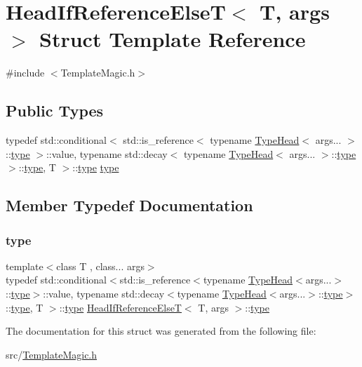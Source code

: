 \hypertarget{struct_head_if_reference_else_t}{}\section{Head\+If\+Reference\+ElseT$<$ T, args $>$ Struct Template Reference}
\label{struct_head_if_reference_else_t}


{\ttfamily \#include $<$Template\+Magic.\+h$>$}

\subsection*{Public Types}
\begin{DoxyCompactItemize}
\item 
typedef std\+::conditional$<$ std\+::is\+\_\+reference$<$ typename \hyperlink{struct_type_head}{Type\+Head}$<$ args... $>$\+::\hyperlink{struct_head_if_reference_else_t_aa668af542560a9a8541b1ff59f23d51a}{type} $>$\+::value, typename std\+::decay$<$ typename \hyperlink{struct_type_head}{Type\+Head}$<$ args... $>$\+::\hyperlink{struct_head_if_reference_else_t_aa668af542560a9a8541b1ff59f23d51a}{type} $>$\+::\hyperlink{struct_head_if_reference_else_t_aa668af542560a9a8541b1ff59f23d51a}{type}, T $>$\+::\hyperlink{struct_head_if_reference_else_t_aa668af542560a9a8541b1ff59f23d51a}{type} \hyperlink{struct_head_if_reference_else_t_aa668af542560a9a8541b1ff59f23d51a}{type}
\end{DoxyCompactItemize}


\subsection{Member Typedef Documentation}
\mbox{\label{struct_head_if_reference_else_t_aa668af542560a9a8541b1ff59f23d51a}} 
\subsubsection{\texorpdfstring{type}{type}}
{\footnotesize\ttfamily template$<$class T , class... args$>$ \\
typedef std\+::conditional$<$std\+::is\+\_\+reference$<$typename \hyperlink{struct_type_head}{Type\+Head}$<$args...$>$\+::\hyperlink{struct_head_if_reference_else_t_aa668af542560a9a8541b1ff59f23d51a}{type}$>$\+::value, typename std\+::decay$<$typename \hyperlink{struct_type_head}{Type\+Head}$<$args...$>$\+::\hyperlink{struct_head_if_reference_else_t_aa668af542560a9a8541b1ff59f23d51a}{type}$>$\+::\hyperlink{struct_head_if_reference_else_t_aa668af542560a9a8541b1ff59f23d51a}{type}, T $>$\+::\hyperlink{struct_head_if_reference_else_t_aa668af542560a9a8541b1ff59f23d51a}{type} \hyperlink{struct_head_if_reference_else_t}{Head\+If\+Reference\+ElseT}$<$ T, args $>$\+::\hyperlink{struct_head_if_reference_else_t_aa668af542560a9a8541b1ff59f23d51a}{type}}



The documentation for this struct was generated from the following file\+:\begin{DoxyCompactItemize}
\item 
src/\hyperlink{_template_magic_8h}{Template\+Magic.\+h}\end{DoxyCompactItemize}

